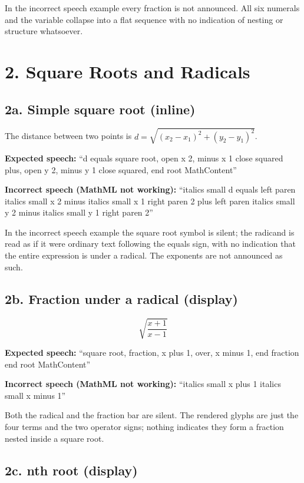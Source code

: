 \documentclass{article}
\begin{document}
In the incorrect speech example every fraction is not announced. All six 
numerals and the variable collapse into a flat sequence with no indication 
of nesting or structure whatsoever.

\section*{2. Square Roots and Radicals}

\subsection*{2a. Simple square root (inline)}

The distance between two points is $d = \sqrt{(x_2 - x_1)^2 + (y_2 - y_1)^2}$.

\textbf{Expected speech:} ``d equals square root, open x 2, 
minus x 1 close squared plus, open y 2, minus y 1 close squared, 
end root MathContent''

\textbf{Incorrect speech (MathML not working):} ``italics small d equals 
left paren italics small x 2 minus italics small x 1 right paren 
2 plus left paren italics small y 2 minus italics small y 1 right paren 2''

In the incorrect speech example the square root symbol is silent; 
the radicand is read as if it were ordinary text following the equals sign, 
with no indication that the entire expression is under a radical. The
exponents are not announced as such.

\subsection*{2b. Fraction under a radical (display)}

\[
  \sqrt{\frac{x + 1}{x - 1}}
\]

\textbf{Expected speech:} ``square root, fraction, x plus 1, over, 
x minus 1, end fraction end root MathContent''

\textbf{Incorrect speech (MathML not working):} ``italics small x plus 1 
italics small x minus 1''

Both the radical and the fraction bar are silent. The rendered glyphs are
just the four terms and the two operator signs; nothing indicates they form
a fraction nested inside a square root.

\subsection*{2c. nth root (display)}
\end{document}
